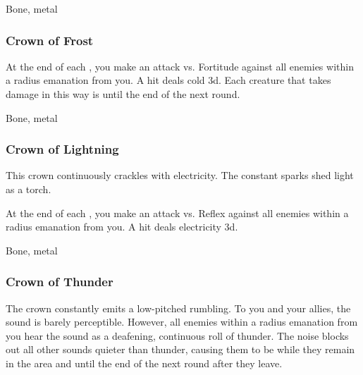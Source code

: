  


 Bone, metal


\lowercase{\hypertarget{item:Crown of Frost}{}}\label{item:Crown of Frost}
\hypertarget{item:Crown of Frost}{\subsubsection{Crown of Frost\hfill{}}}

At the end of each , you make an attack vs. Fortitude against all enemies within a \areamed radius emanation from you.
A hit deals cold  \minus3d.
Each creature that takes damage in this way is \fatigued until the end of the next round.



 


 Bone, metal


\lowercase{\hypertarget{item:Crown of Lightning}{}}\label{item:Crown of Lightning}
\hypertarget{item:Crown of Lightning}{\subsubsection{Crown of Lightning\hfill{}}}

This crown continuously crackles with electricity.
The constant sparks shed light as a torch.

At the end of each , you make an attack vs. Reflex against all enemies within a \areamed radius emanation from you.
A hit deals electricity  \minus3d.



 


 Bone, metal


\lowercase{\hypertarget{item:Crown of Thunder}{}}\label{item:Crown of Thunder}
\hypertarget{item:Crown of Thunder}{\subsubsection{Crown of Thunder\hfill{}}}

The crown constantly emits a low-pitched rumbling.
To you and your allies, the sound is barely perceptible.
However, all enemies within a \arealarge radius emanation from you hear the sound as a deafening, continuous roll of thunder.
The noise blocks out all other sounds quieter than thunder, causing them to be \deafened while they remain in the area and until the end of the next round after they leave.



